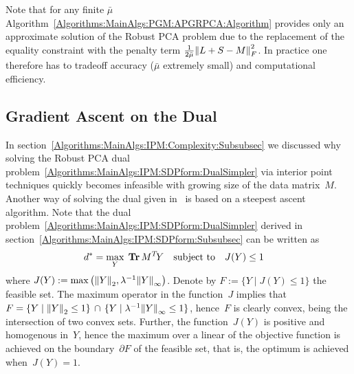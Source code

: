 \begin{remark}
\label{Algorithms:MainAlgs:PGM:APGRPCA:AccRemark}
Note that for any finite $\bar{\mu}$ Algorithm~\ref{Algorithms:MainAlgs:PGM:APGRPCA:Algorithm} provides only an approximate solution of the Robust PCA problem due to the replacement of the equality constraint with the penalty term $\frac{1}{2\bar{\mu}} {\left\|L+S-M\right\|}_{F}^{2}$. In practice one therefore has to tradeoff accuracy ($\bar{\mu}$ extremely small) and computational efficiency.
\end{remark}


\subsection{Gradient Ascent on the Dual}
\label{Algorithms:MainAlgs:GAD:Subsec}

In section~\ref{Algorithms:MainAlgs:IPM:Complexity:Subsubsec} we discussed why solving the Robust PCA dual problem~\eqref{Algorithms:MainAlgs:IPM:SDPform:DualSimpler} via interior point techniques quickly becomes infeasible with growing size of the data matrix~$M$. Another way of solving the dual given in~\cite{Lin:2009kx} is based on a steepest ascent algorithm. Note that the dual problem~\eqref{Algorithms:MainAlgs:IPM:SDPform:DualSimpler} derived in section~\ref{Algorithms:MainAlgs:IPM:SDPform:Subsubsec} can be written as 
%
\begin{align}
d^* = \max_{Y} \; &\operatorname{\mathbf{Tr}} M^T\!Y \quad \text{subject to}\quad J(Y) \leq 1
\label{Algorithms:MainAlgs:GAD:Dual}
\end{align}
%
where $J(Y) := \max\left({\left\|Y\right\|}_{2}^{}, \lambda^{-1}{\left\|Y\right\|}_{\infty}^{}\right)$. Denote by $F := \{Y \mid J(Y)\leq1 \}$ the feasible set. The maximum operator in the function~$J$ implies that~$F=\{Y \mid {\left\|Y\right\|}_{2}^{}\leq1\}\, \cap\, \{Y \mid \lambda^{-1}{\left\|Y\right\|}_{\infty}^{}\leq1\}$, hence~$F$ is clearly convex, being the intersection of two convex sets. Further, the function~$J(Y)$ is positive and homogenous in~$Y$, hence the maximum over a linear of the objective function is achieved on the boundary~$\partial F$ of the feasible set, that is, the optimum is achieved when~$J(Y)=1$. 

